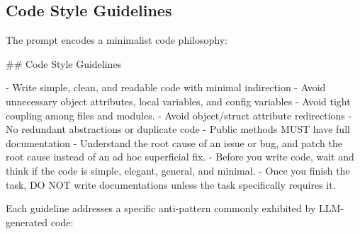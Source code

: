 \documentclass{article}
\begin{document}
\subsection{Code Style Guidelines}

The prompt encodes a minimalist code philosophy:

\begin{prompt}
## Code Style Guidelines

- Write simple, clean, and readable code with minimal
  indirection
- Avoid unnecessary object attributes, local variables, and
  config variables
- Avoid tight coupling among files and modules.
- Avoid object/struct attribute redirections
- No redundant abstractions or duplicate code
- Public methods MUST have full documentation
- Understand the root cause of an issue or bug, and patch
  the root cause instead of an ad hoc superficial fix.
- Before you write code, wait and think if the code is
  simple, elegant, general, and minimal.
- Once you finish the task, DO NOT write documentations
  unless the task specifically requires it.
\end{prompt}

\noindent Each guideline addresses a specific anti-pattern commonly
exhibited by LLM-generated code:
\end{document}
